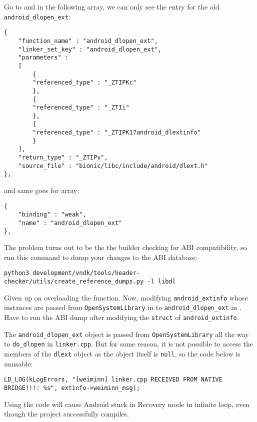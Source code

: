 Go to  and in the following  array, we can only see the entry for the old \texttt{android\_dlopen\_ext}:
\begin{lstlisting}
{
    "function_name" : "android_dlopen_ext",
    "linker_set_key" : "android_dlopen_ext",
    "parameters" :
    [
        {
        "referenced_type" : "_ZTIPKc"
        },
        {
        "referenced_type" : "_ZTIi"
        },
        {
        "referenced_type" : "_ZTIPK17android_dlextinfo"
        }
    ],
    "return_type" : "_ZTIPv",
    "source_file" : "bionic/libc/include/android/dlext.h"
},
\end{lstlisting}
and same goes for  array:
\begin{lstlisting}
{
    "binding" : "weak",
    "name" : "android_dlopen_ext"
},
\end{lstlisting}
The problem turns out to be the the builder checking for ABI compatibility, so run this command to dump your changes to the ABI database:
\begin{lstlisting}
python3 development/vndk/tools/header-checker/utils/create_reference_dumps.py -l libdl
\end{lstlisting}

Given up on overloading the function. Now, modifying \texttt{android\_extinfo} whose instances are passed from \texttt{OpenSystemLibrary} in  to \texttt{android\_dlopen\_ext} in . Have to run the ABI dump after modifying the \texttt{struct} of \texttt{android\_extinfo}.

The \texttt{android\_dlopen\_ext} object is passed from \texttt{OpenSystemLibrary} all the way to  \texttt{do\_dlopen} in \texttt{linker.cpp}. But for some reason, it is not possible to access the members of the \texttt{dlext} object as the object itself is \texttt{null}, so the code below is unusable:
\begin{lstlisting}
LD_LOG(kLogErrors, "[weiminn] linker.cpp RECEIVED FROM NATIVE BRIDGE!!!: %s", extinfo->weiminn_msg);
\end{lstlisting}
Using the code will cause Android stuck in Recovery mode in infinite loop, even though the project successfully compiles.


